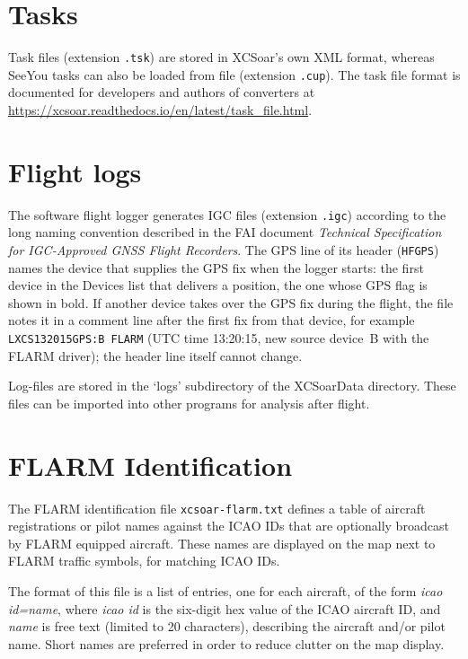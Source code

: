 \section{Tasks}

Task files (extension \verb|.tsk|) are stored in XCSoar's own XML format,
whereas SeeYou tasks can also be loaded from file (extension \verb|.cup|).
The task file format is documented for developers and authors of
converters at \url{https://xcsoar.readthedocs.io/en/latest/task_file.html}.

\section{Flight logs} \label{sec:logfiles}

The software flight logger generates IGC files (extension \verb|.igc|)
according to the long naming convention described in the FAI 
document {\em Technical Specification for IGC-Approved GNSS Flight Recorders}.  
The GPS line of its header (\verb|HFGPS|) names the device that supplies
the GPS fix when the logger starts: the first device in the Devices list
that delivers a position, the one whose GPS flag is shown in bold.
If another device takes over the GPS fix during the flight, the file
notes it in a comment line after the first fix from that device, for
example \verb|LXCS132015GPS:B FLARM| (UTC time 13:20:15, new source
device~B with the FLARM driver); the header line itself cannot change.

Log-files are stored in the `logs' subdirectory of the XCSoarData directory.
These files can be imported into other programs for analysis after flight.

\section{FLARM Identification}\label{sec:flarm-ident-file}

The FLARM identification file \verb|xcsoar-flarm.txt| defines a table
of aircraft registrations or pilot names against the ICAO IDs that are
optionally broadcast by FLARM equipped aircraft.  These names are
displayed on the map next to FLARM traffic symbols, for matching ICAO
IDs.

The format of this file is a list of entries, one for each aircraft,
of the form {\em icao id=name}, where {\em icao id} is the six-digit
hex value of the ICAO aircraft ID, and {\em name} is free text
(limited to 20 characters), describing the aircraft and/or pilot name.
Short names are preferred in order to reduce clutter on the map
display.


